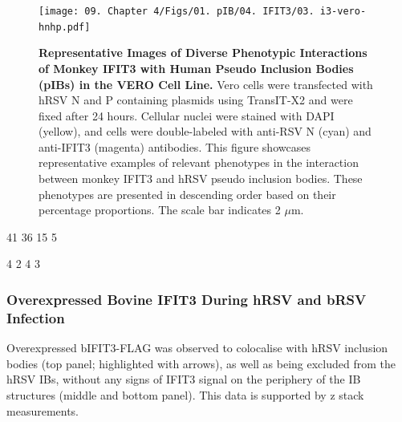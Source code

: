 \begin{figure}
    \centering
    \texttt{[image: 09. Chapter 4/Figs/01. pIB/04. IFIT3/03. i3-vero-hnhp.pdf]}
    \caption[Representative Images of Diverse Phenotypic Interactions of Monkey IFIT3 with Human Pseudo Inclusion Bodies (pIBs) in the VERO Cell Line.]{\textbf{Representative Images of Diverse Phenotypic Interactions of Monkey IFIT3 with Human Pseudo Inclusion Bodies (pIBs) in the VERO Cell Line.} Vero cells were transfected with hRSV N and P containing plasmids using TransIT-X2 and were fixed after 24 hours. Cellular nuclei were stained with DAPI (yellow), and cells were double-labeled with anti-RSV N (cyan) and anti-IFIT3 (magenta) antibodies. This figure showcases representative examples of relevant phenotypes in the interaction between monkey IFIT3 and hRSV pseudo inclusion bodies. These phenotypes are presented in descending order based on their percentage proportions. The scale bar indicates 2 \(\mu \mbox{m}\).}
    \label{fig:Representative Images of Diverse Phenotypic Interactions of Monkey IFIT3 with Human Pseudo Inclusion Bodies (pIBs) in the VERO Cell Line}
\end{figure}

41 36 15 5

4 2 4 3

\subsubsection{Overexpressed Bovine IFIT3 During hRSV and bRSV Infection}
Overexpressed bIFIT3-FLAG was observed to colocalise with hRSV inclusion bodies (top panel; highlighted with arrows), as well as being excluded from the hRSV IBs, without any signs of IFIT3 signal on the periphery of the IB structures (middle and bottom panel). This data is supported by z stack measurements.

